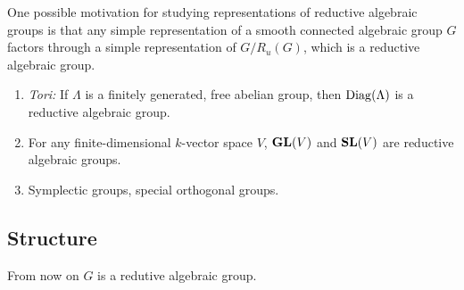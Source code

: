 One possible motivation for studying representations of reductive algebraic groups is that any simple representation of a smooth connected algebraic group $G$ factors through a simple representation of $G /R_u(G)$, which is a reductive algebraic group.

\begin{example} \leavevmode
	\begin{enumerate}[(1)]
		\item \emph{Tori:} If $\Lambda$ is a finitely generated, free abelian group, then $\operatorname{Diag}(\Lambda)$ is a reductive algebraic group.
		\item For any finite-dimensional $k$-vector space $V$, $\mathbf{GL}(V)$ and $\mathbf{SL}(V)$ are reductive algebraic groups.
		\item Symplectic groups, special orthogonal groups.
	\end{enumerate}
\end{example}
\subsection{Structure} From now on $G$ is a redutive algebraic group.

